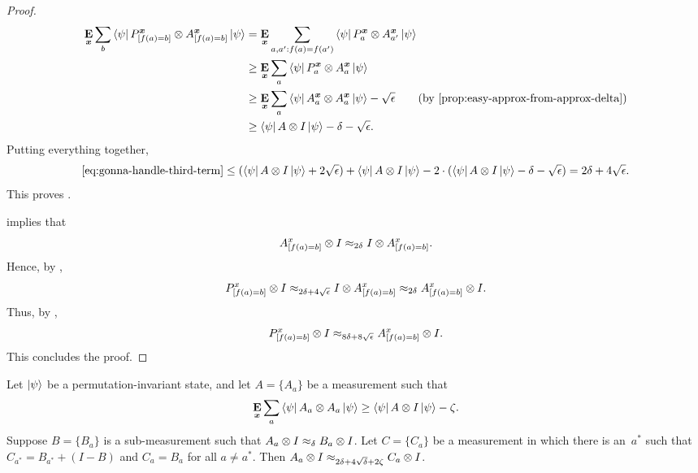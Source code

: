 \begin{proof}
\begin{align*}
\E_{\bx} \sum_b \bra{\psi}  P^{\bx}_{[f(a)=b]} \ot A^{\bx}_{[f(a)=b]} \ket{\psi}
&= \E_{\bx} \sum_{a, a': f(a) = f(a')} \bra{\psi}  P^{\bx}_{a} \ot A^{\bx}_{a'} \ket{\psi}\\
&\geq \E_{\bx} \sum_{a} \bra{\psi}  P^{\bx}_{a} \ot A^{\bx}_{a} \ket{\psi}\\
&\geq \E_{\bx} \sum_{a} \bra{\psi}  A^{\bx}_{a} \ot A^{\bx}_{a} \ket{\psi} - \sqrt{\eps}
						\tag{by \Cref{prop:easy-approx-from-approx-delta}} \\
&\geq \bra{\psi} A \otimes I \ket{\psi} - \delta - \sqrt{\eps}.
\end{align*}
Putting everything together,
\begin{equation*}
\eqref{eq:gonna-handle-third-term}
\leq (\bra{\psi} A \otimes I \ket{\psi} + 2\sqrt{\epsilon}) + \bra{\psi} A \otimes I \ket{\psi}
	- 2 \cdot(\bra{\psi} A \otimes I \ket{\psi} - \delta - \sqrt{\epsilon})
= 2\delta + 4\sqrt{\epsilon}.
\end{equation*}
This proves .


 implies that
\begin{equation*}
A^x_{[f(a)=b]} \otimes I \approx_{2\delta} I \otimes A^x_{[f(a)=b]}.
\end{equation*}
Hence, by ,
\begin{equation*}
P^x_{[f(a)=b]} \otimes I
\approx_{2\delta + 4\sqrt{\epsilon}} I \otimes A_{[f(a)=b]}^x
\approx_{2\delta} A^x_{[f(a)=b]} \otimes I.
\end{equation*}
Thus, by ,
\begin{equation*}
P^x_{[f(a)=b]} \otimes I
\approx_{8\delta + 8\sqrt{\epsilon}}A^x_{[f(a)=b]} \otimes I.
\end{equation*}
This concludes the proof.
\end{proof}

\begin{proposition}\label{prop:completing-to-measurement}
		Let $\ket{\psi}$ be a permutation-invariant state,
		and let $A = \{A_a\}$ be a measurement such that
		\begin{equation*}
		\mathop{\bf E\/}_{{\boldsymbol{x}}} \sum_a \bra{\psi} A_a \otimes A_a \ket{\psi} \geq  \bra{\psi} A \otimes I \ket{\psi} - \zeta.
		\end{equation*}
		Suppose $B = \{B_a\}$ is a sub-measurement such that
		$A_a\otimes I \approx_{\delta} B_a\otimes I$.
		Let $C = \{C_a\}$ be a measurement in which there is an~$a^*$
		such that $C_{a^*} = B_{a^*} + (I-B)$ and $C_a = B_a$ for all $a \neq a^*$.
		Then $A_a \otimes I \approx_{2\delta + 4 \sqrt{\delta} + 2\zeta} C_a \otimes I$.
		\end{proposition}
		
